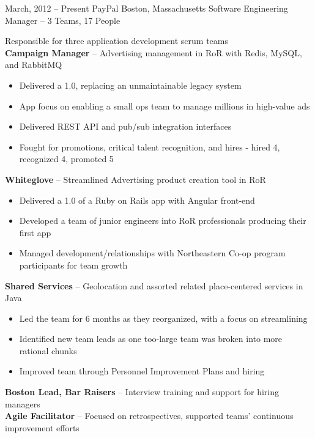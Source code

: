 \documentclass[]{friggeri-cv}
\begin{document}
\begin{entrylist}
  \entryalt
    {March, 2012 -- Present}
    {PayPal}
    {Boston, Massachusetts}
    {Software Engineering Manager -- 3 Teams, 17 People}
    {Responsible for three application development scrum teams \\
      \textbf{Campaign Manager} -- Advertising management in RoR with Redis, MySQL,
      and RabbitMQ
    \begin{itemize}
      \item Delivered a 1.0, replacing an unmaintainable legacy system
      \item App focus on enabling a small ops team to manage millions in
        high-value ads
      \item Delivered REST API and pub/sub integration interfaces
      \item Fought for promotions, critical talent recognition, and hires - hired 4, recognized 4, promoted 5
    \end{itemize}
      \textbf{Whiteglove} -- Streamlined Advertising product creation tool in RoR
    \begin{itemize}
      \item Delivered a 1.0 of a Ruby on Rails app with Angular front-end
      \item Developed a team of junior engineers into RoR professionals producing their first app
      \item Managed development/relationships with Northeastern Co-op program
        participants for team growth
    \end{itemize} 
      \textbf{Shared Services} -- Geolocation and assorted related place-centered
      services in Java
    \begin{itemize}
      \item Led the team for 6 months as they reorganized, with a focus on
        streamlining
      \item Identified new team leads as one too-large team was broken
        into more rational chunks
      \item Improved team through Personnel Improvement Plans and hiring
    \end{itemize}
    \textbf{Boston Lead, Bar Raisers} -- Interview training and support for hiring managers\\
    \textbf{Agile Facilitator} -- Focused on retrospectives, supported teams' continuous improvement efforts}


\end{entrylist}
\end{document}
